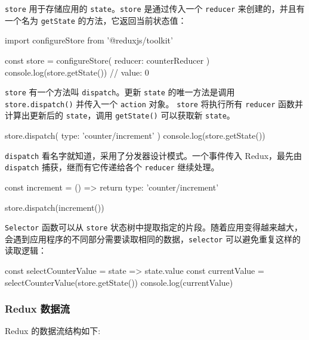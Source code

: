 \texttt{store} 用于存储应用的 \texttt{state}。\texttt{store} 是通过传入一个 \texttt{reducer} 来创建的，并且有一个名为 \texttt{getState} 的方法，它返回当前状态值：

\begin{JavaScript}
import { configureStore } from '@reduxjs/toolkit'

const store = configureStore({ reducer: counterReducer })
console.log(store.getState())
// {value: 0}
\end{JavaScript}

\texttt{store} 有一个方法叫 \texttt{dispatch}。更新 \texttt{state} 的唯一方法是调用 \texttt{store.dispatch()} 并传入一个 \texttt{action} 对象。 \texttt{store} 将执行所有 \texttt{reducer} 函数并计算出更新后的 \texttt{state}，调用 \texttt{getState()} 可以获取新 \texttt{state}。

\begin{JavaScript}
store.dispatch({ type: 'counter/increment' })
console.log(store.getState())
\end{JavaScript}

\texttt{dispatch} 看名字就知道，采用了分发器设计模式。一个事件传入 Redux，最先由 \texttt{dispatch} 捕获，继而有它传递给各个 \texttt{reducer} 继续处理。

\begin{JavaScript}
const increment = () => {
  return {
    type: 'counter/increment'
  }
}

store.dispatch(increment())
\end{JavaScript}

\texttt{Selector} 函数可以从 \texttt{store} 状态树中提取指定的片段。随着应用变得越来越大，会遇到应用程序的不同部分需要读取相同的数据，\texttt{selector} 可以避免重复这样的读取逻辑：

\begin{JavaScript}
const selectCounterValue = state => state.value
const currentValue = selectCounterValue(store.getState())
console.log(currentValue)
\end{JavaScript}


\subsubsection{Redux 数据流}

Redux 的数据流结构如下:

